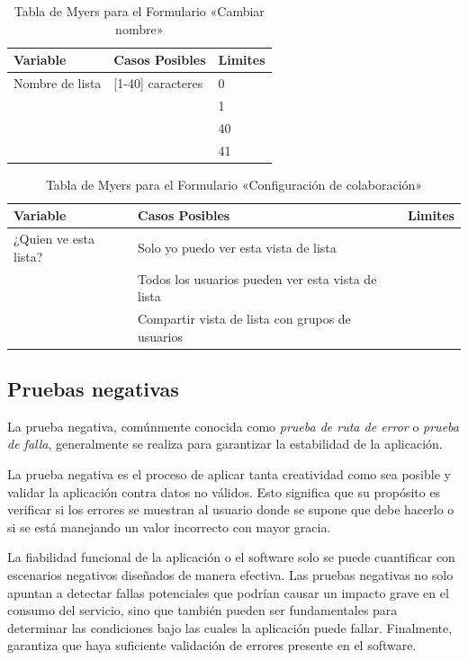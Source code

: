 \begin{table}
\centering
\begin{tabular}{|l|l|l|}
\hline
\textbf{Variable} & \textbf{Casos Posibles} & \textbf{Limites} \\
\hline
Nombre de lista & [1-40] caracteres & 0 \\
& & 1 \\
& & 40 \\
& & 41 \\
\hline
\end{tabular}
\caption{Tabla de Myers para el Formulario «Cambiar nombre»}
\label{myers_08}
\end{table}

\begin{table}
\centering
\begin{tabular}{|l|l|l|}
\hline
\textbf{Variable} & \textbf{Casos Posibles} & \textbf{Limites} \\
\hline
¿Quien ve esta lista? & Solo yo puedo ver esta vista de lista & \\
& Todos los usuarios pueden ver esta vista de lista & \\
& Compartir vista de lista con grupos de usuarios & \\
\hline
\end{tabular}
\caption{Tabla de Myers para el Formulario «Configuración de colaboración»}
\label{myers_09}
\end{table}

\subsection{Pruebas negativas}
La prueba negativa, comúnmente conocida como \emph{prueba de ruta de error} o
\emph{prueba de falla}, generalmente se realiza para garantizar la estabilidad
de la aplicación.

La prueba negativa es el proceso de aplicar tanta creatividad como sea posible y
validar la aplicación contra datos no válidos. Esto significa que su propósito
es verificar si los errores se muestran al usuario donde se supone que debe
hacerlo o si se está manejando un valor incorrecto con mayor gracia.

La fiabilidad funcional de la aplicación o el software solo se puede cuantificar
con escenarios negativos diseñados de manera efectiva. Las pruebas negativas no
solo apuntan a detectar fallas potenciales que podrían causar un impacto grave
en el consumo del servicio, sino que también pueden ser fundamentales para
determinar las condiciones bajo las cuales la aplicación puede fallar.
Finalmente, garantiza que haya suficiente validación de errores presente en el
software\cite{Nadig}.

